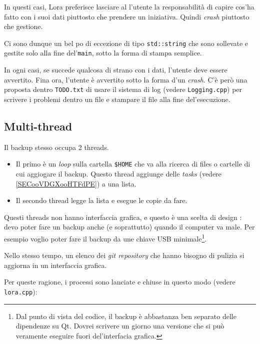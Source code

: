 \documentclass[a4paper,12pt]{article}
\newcommand{\info}[1]{\texttt{#1}}
\begin{document}
In questi casi, Lora preferisce lasciare al l'utente la responsabilità di capire cos'ha fatto con i suoi dati piuttosto che prendere un iniziativa. Quindi \emph{crash} piuttosto che gestione.

Ci sono dunque un bel po di eccezione di tipo \info{std::string} che sono sollevate e gestite solo alla fine del'\info{main}, sotto la forma di stampa semplice.

In ogni casi, se succede qualcosa di strano con i dati, l'utente deve essere avvertito. Fina ora, l'utente è avvertito sotto la forma d'un \emph{crash}. C'è però una proposta dentro \info{TODO.txt} di usare il sistema di log (vedere \info{Logging.cpp}) per scrivere i problemi dentro un file e stampare il file alla fine del'esecuzione.

\subsection{Multi-thread}

Il backup stesso occupa 2 threads.
\begin{itemize}
    \item Il primo è un \emph{loop} sulla cartella \info{\$HOME} che va alla ricerca di files o cartelle di cui aggiogare il backup. Questo thread aggiunge delle \emph{tasks} (vedere \ref{SECooVDGXooHTFdPE}) a una lista.
    \item Il secondo thread legge la lista e esegue le copie da fare.
\end{itemize}
Questi threads non hanno interfaccia grafica, e questo è una scelta di design : devo poter fare un backup anche (e soprattutto) quando il computer va male. Per esempio voglio poter fare il backup da une chiave USB minimale\footnote{Dal punto di vista del codice, il backup è abbastanza ben separato delle dipendenze su Qt. Dovrei scrivere un giorno una versione che si può veramente eseguire fuori del'interfacia grafica.}.

Nello stesso tempo, un elenco dei \emph{git repository} che hanno bisogno di pulizia si aggiorna in un interfaccia grafica.

Per queste ragione, i processi sono lanciate e chiuse in questo modo (vedere \info{lora.cpp}):

\end{document}

